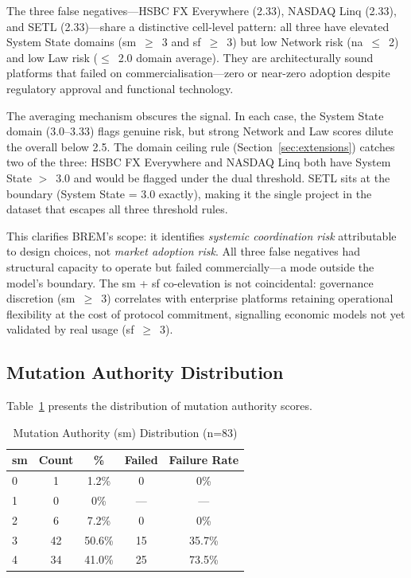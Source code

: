 \documentclass[conference]{IEEEtran}
\begin{document}
The three false negatives---HSBC FX Everywhere (2.33), NASDAQ Linq (2.33), and SETL (2.33)---share a distinctive cell-level pattern: all three have elevated System State domains (sm~$\geq$~3 and sf~$\geq$~3) but low Network risk (na~$\leq$~2) and low Law risk ($\leq$~2.0 domain average). They are architecturally sound platforms that failed on commercialisation---zero or near-zero adoption despite regulatory approval and functional technology.

The averaging mechanism obscures the signal. In each case, the System State domain (3.0--3.33) flags genuine risk, but strong Network and Law scores dilute the overall below 2.5. The domain ceiling rule (Section~\ref{sec:extensions}) catches two of the three: HSBC FX Everywhere and NASDAQ Linq both have System State $>$~3.0 and would be flagged under the dual threshold. SETL sits at the boundary (System State = 3.0 exactly), making it the single project in the dataset that escapes all three threshold rules.

This clarifies BREM's scope: it identifies \textit{systemic coordination risk} attributable to design choices, not \textit{market adoption risk}. All three false negatives had structural capacity to operate but failed commercially---a mode outside the model's boundary. The sm + sf co-elevation is not coincidental: governance discretion (sm~$\geq$~3) correlates with enterprise platforms retaining operational flexibility at the cost of protocol commitment, signalling economic models not yet validated by real usage (sf~$\geq$~3).

\subsection{Mutation Authority Distribution}

Table~\ref{tab:sm} presents the distribution of mutation authority scores.

\begin{table}[htbp]
\caption{Mutation Authority (sm) Distribution (n=83)}
\label{tab:sm}
\centering
\begin{tabular}{lcccc}
\toprule
\textbf{sm} & \textbf{Count} & \textbf{\%} & \textbf{Failed} & \textbf{Failure Rate} \\
\midrule
0 & 1 & 1.2\% & 0 & 0\% \\
1 & 0 & 0\% & --- & --- \\
2 & 6 & 7.2\% & 0 & 0\% \\
3 & 42 & 50.6\% & 15 & 35.7\% \\
4 & 34 & 41.0\% & 25 & 73.5\% \\
\bottomrule
\end{tabular}
\end{table}
\end{document}
